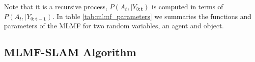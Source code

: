 Note that it is a recursive process, $P(A_t,|Y_{0:\mathbf{t}})$ is computed in terms of  $P(A_t,|Y_{0:\mathbf{t-1}})$.
In table \ref{tab:mlmf_parameters} we summaries the functions and parameters of the MLMF for two random variables, an agent and object.
\begin{table}[h]
\centering
{}
\caption{MLMF Functions with associated parameters.  }
\label{tab:mlmf_parameters}
\end{table}

\subsection{MLMF-SLAM Algorithm}



%   
%


